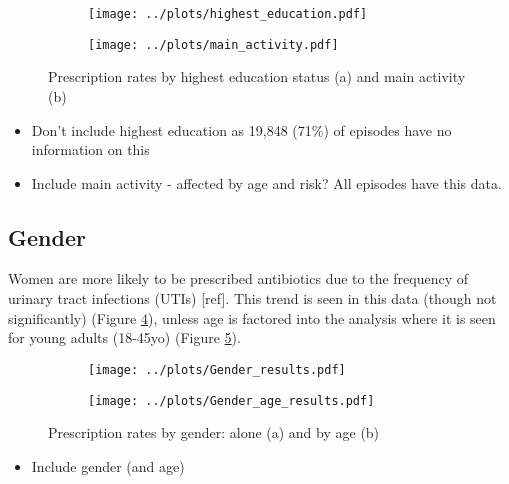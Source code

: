 \documentclass{article}
\begin{document}
\begin{figure}[htbp]
    \centering
    \begin{subfigure}[b]{0.48\textwidth}
   		\texttt{[image: ../plots/highest\_education.pdf]}
   		\caption{}
   		\label{fig:hedu}
    \end{subfigure}
    \begin{subfigure}[b]{0.48\textwidth}
        \texttt{[image: ../plots/main\_activity.pdf]}
		\caption{}
		\label{fig:maina}
    \end{subfigure}
    \caption{Prescription rates by highest education status (a) and main activity (b)}
    \label{fig:sociof}
\end{figure}

\begin{itemize}
	\item Don't include highest education as 19,848 (71\%) of episodes have no information on this
	\item Include main activity - affected by age and risk? All episodes have this data.
\end{itemize}

\subsection{Gender}

Women are more likely to be prescribed antibiotics due to the frequency of urinary tract infections (UTIs) [ref]. This trend is seen in this data (though not significantly) (Figure \ref{fig:gend}), unless age is factored into the analysis where it is seen for young adults (18-45yo) (Figure \ref{fig:genda}). 

\begin{figure}[htbp]
    \centering
    \begin{subfigure}[b]{0.48\textwidth}
   		\texttt{[image: ../plots/Gender\_results.pdf]}
   		\caption{}
   		\label{fig:gend}
    \end{subfigure}
    \begin{subfigure}[b]{0.48\textwidth}
        \texttt{[image: ../plots/Gender\_age\_results.pdf]}
		\caption{}
		\label{fig:genda}
    \end{subfigure}
    \caption{Prescription rates by gender: alone (a) and by age (b)}
    \label{fig:gendf}
\end{figure}

\begin{itemize}
	\item Include gender (and age)
\end{itemize}
\end{document}
